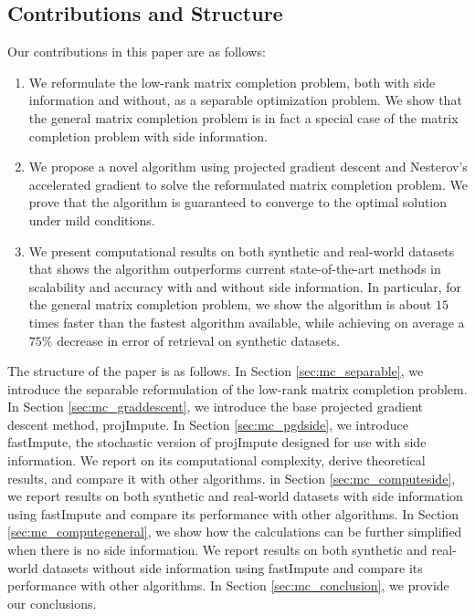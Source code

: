 \documentclass[twoside,11pt]{article}
\begin{document}
\subsection*{Contributions and Structure}
Our contributions in this paper are as follows:
\begin{enumerate}
	\item We reformulate the low-rank matrix completion problem, both with side information and without,  as a separable optimization problem. We show that the general matrix completion problem is in fact a special case of the matrix completion problem with side information.
	\item We propose a novel algorithm using projected gradient descent and Nesterov's accelerated gradient to solve the reformulated matrix completion problem. We prove that the algorithm is guaranteed to converge to the optimal solution under mild conditions. 
	\item We present computational results on both synthetic and real-world datasets that shows the algorithm outperforms current state-of-the-art methods in scalability and accuracy
	 with and without side information. In particular, for the general matrix completion problem, we show the algorithm is about $15$ times  faster than the fastest algorithm available, while achieving on average a $75\%$ decrease in error of retrieval on synthetic datasets. 
\end{enumerate}
The structure of the paper is as follows.
In Section  \ref{sec:mc_separable}, we introduce the separable reformulation of the low-rank matrix completion problem.
In Section \ref{sec:mc_graddescent}, we introduce the base projected gradient descent method, projImpute.
In Section \ref{sec:mc_pgdside}, we introduce fastImpute, the stochastic version of projImpute designed for use with side information. We report on its computational complexity, derive theoretical results, and compare it with other algorithms.
in Section \ref{sec:mc_computeside}, we report results on both synthetic and real-world datasets with side information using fastImpute and compare its performance with other algorithms.
In Section \ref{sec:mc_computegeneral}, we show how the calculations can be further simplified when there is no side information. We report results on both synthetic and real-world datasets without side information using fastImpute and compare its performance with other algorithms.
In Section \ref{sec:mc_conclusion}, we provide our conclusions. 
\end{document}
